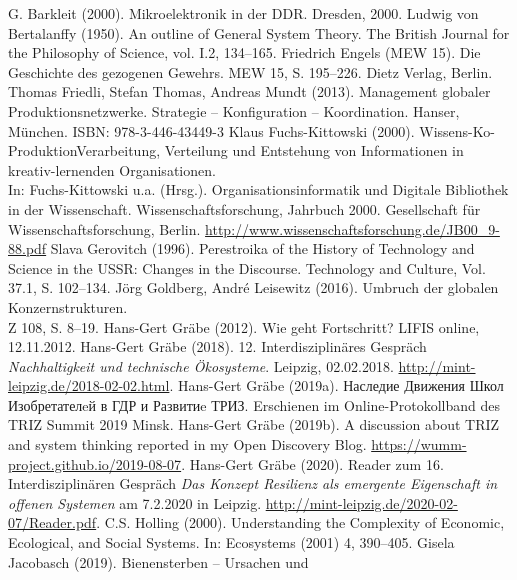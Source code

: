 \documentclass[11pt,a4paper]{article}
\begin{document}
\begin{thebibliography}{xxx}
 G. Barkleit (2000). Mikroelektronik in der
  DDR. Dresden, 2000.
 Ludwig von Bertalanffy (1950). An outline of General
  System Theory. The British Journal for the Philosophy of Science, vol. I.2,
  134–165.
 Friedrich Engels (MEW 15). Die Geschichte des gezogenen
  Gewehrs.  MEW 15, S. 195--226. Dietz Verlag, Berlin.
 Thomas Friedli, Stefan Thomas, Andreas Mundt (2013).
  Management globaler Produktionsnetzwerke. Strategie – Konfiguration –
  Koordination. Hanser, München. ISBN: 978-3-446-43449-3
 Klaus Fuchs-Kittowski (2000).
  Wissens-Ko-ProduktionVerarbeitung, Verteilung und Entstehung von
  Informationen in kreativ-lernenden Organisationen.\\ In: Fuchs-Kittowski
  u.a. (Hrsg.). Organisationsinformatik und Digitale Bibliothek in der
  Wissenschaft. Wissenschaftsforschung, Jahrbuch 2000. Gesellschaft für
  Wissenschaftsforschung, Berlin.
  \url{http://www.wissenschaftsforschung.de/JB00_9-88.pdf}
 Slava Gerovitch (1996). Perestroika of the History of
  Technology and Science in the USSR: Changes in the Discourse. Technology and
  Culture, Vol. 37.1, S. 102--134.
 Jörg Goldberg, André Leisewitz (2016). Umbruch der
  globalen Konzernstrukturen.\\ Z 108, S. 8--19.
 Hans-Gert Gräbe (2012). Wie geht Fortschritt? LIFIS
  online, 12.11.2012.
 Hans-Gert Gräbe (2018).  12. Interdisziplinäres Gespräch
  \emph{Nachhaltigkeit und technische Ökosysteme}. Leipzig, 02.02.2018. 
  \url{http://mint-leipzig.de/2018-02-02.html}.
 Hans-Gert Gräbe (2019a).
  \foreignlanguage{russian}{Наследие Движения Школ Изобретателeй в ГДР и
    Развитиe ТРИЗ.}  Erschienen im Online-Protokollband des TRIZ Summit 2019
  Minsk.
 Hans-Gert Gräbe (2019b).  A discussion about TRIZ
    and system thinking reported in my Open Discovery Blog.
    \url{https://wumm-project.github.io/2019-08-07}.
 Hans-Gert Gräbe (2020). Reader zum 16. Interdisziplinären
  Gespräch \emph{Das Konzept Resilienz als emergente Eigenschaft in offenen
    Systemen} am 7.2.2020 in Leipzig.
  \url{http://mint-leipzig.de/2020-02-07/Reader.pdf}.
 C.S. Holling (2000). Understanding the Complexity of
  Economic, Ecological, and Social Systems. In: Ecosystems (2001) 4, 390–405.
 Gisela Jacobasch (2019). Bienensterben -- Ursachen und

\end{thebibliography}
\end{document}
